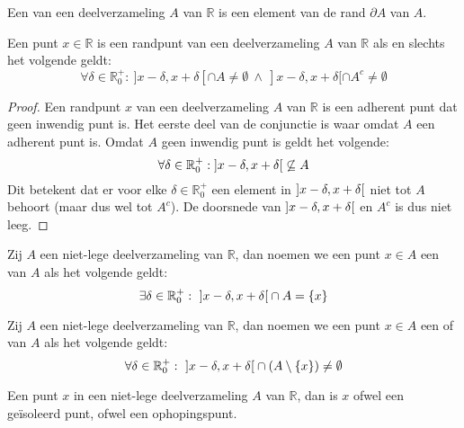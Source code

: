 \documentclass[main.tex]{subfiles}
\begin{document}
\begin{de}
  Een  van een deelverzameling $A$ van $\mathbb{R}$ is een element van de rand $\partial A$ van $A$.
\end{de}

\begin{st}
  Een punt $x\in \mathbb{R}$ is een randpunt van een deelverzameling $A$ van $\mathbb{R}$ als en slechts het volgende geldt:
  \[ \forall \delta \in \mathbb{R}_{0}^{+}:\ ]x-\delta,x+\delta[ \cap A \neq \emptyset\ \wedge\  ]x-\delta,x+\delta[ \cap A^{c} \neq \emptyset \]

  \begin{proof}
    Een randpunt $x$ van een deelverzameling $A$ van $\mathbb{R}$ is een adherent punt dat geen inwendig punt is.
    Het eerste deel van de conjunctie is waar omdat $A$ een adherent punt is.
    Omdat $A$ geen inwendig punt is geldt het volgende:
    \[ \forall \delta \in \mathbb{R}_{0}^{+}: \interval[open]{x-\delta}{x+\delta} \not\subseteq A \]
    Dit betekent dat er voor elke $\delta \in \mathbb{R}_{0}^{+}$ een element in $\interval[open]{x-\delta}{x+\delta}$ niet tot $A$ behoort (maar dus wel tot $A^{c}$).
    De doorsnede van $\interval[open]{x-\delta}{x+\delta}$ en $A^{c}$ is dus niet leeg.
  \end{proof}
  \feed
\end{st}

\begin{de}
  Zij $A$ een niet-lege deelverzameling van $\mathbb{R}$, dan noemen we een punt $x\in A$ een  van $A$ als het volgende geldt:
  \[ \exists \delta \in \mathbb{R}_{0}^{+}:\ \interval[open]{x-\delta}{x+\delta} \cap A = \{ x \} \]
\end{de}

\begin{de}
  Zij $A$ een niet-lege deelverzameling van $\mathbb{R}$, dan noemen we een punt $x\in A$ een  of  van $A$ als het volgende geldt:
  \[ \forall \delta \in \mathbb{R}_{0}^{+}:\ \interval[open]{x-\delta}{x+\delta} \cap (A \setminus \{x\}) \neq \emptyset \]
\end{de}

\begin{opm}
  Een punt $x$ in een niet-lege deelverzameling $A$ van $\mathbb{R}$, dan is $x$ ofwel een ge\"isoleerd punt, ofwel een ophopingspunt.
\end{opm}
\end{document}
